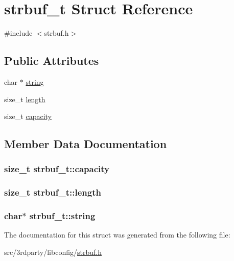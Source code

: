 \hypertarget{structstrbuf__t}{\section{strbuf\-\_\-t Struct Reference}
\label{structstrbuf__t}
}


{\ttfamily \#include $<$strbuf.\-h$>$}

\subsection*{Public Attributes}
\begin{DoxyCompactItemize}
\item 
char $\ast$ \hyperlink{structstrbuf__t_ac33d87e4a1e65b81c34728c08c58e225}{string}
\item 
size\-\_\-t \hyperlink{structstrbuf__t_ae6fc3758286e761d9c7873b489786a89}{length}
\item 
size\-\_\-t \hyperlink{structstrbuf__t_af532e798544a7dab19767406c6504649}{capacity}
\end{DoxyCompactItemize}


\subsection{Member Data Documentation}
\hypertarget{structstrbuf__t_af532e798544a7dab19767406c6504649}{
\subsubsection[{capacity}]{\setlength{\rightskip}{0pt plus 5cm}size\-\_\-t strbuf\-\_\-t\-::capacity}}\label{structstrbuf__t_af532e798544a7dab19767406c6504649}
\hypertarget{structstrbuf__t_ae6fc3758286e761d9c7873b489786a89}{
\subsubsection[{length}]{\setlength{\rightskip}{0pt plus 5cm}size\-\_\-t strbuf\-\_\-t\-::length}}\label{structstrbuf__t_ae6fc3758286e761d9c7873b489786a89}
\hypertarget{structstrbuf__t_ac33d87e4a1e65b81c34728c08c58e225}{
\subsubsection[{string}]{\setlength{\rightskip}{0pt plus 5cm}char$\ast$ strbuf\-\_\-t\-::string}}\label{structstrbuf__t_ac33d87e4a1e65b81c34728c08c58e225}


The documentation for this struct was generated from the following file\-:\begin{DoxyCompactItemize}
\item 
src/3rdparty/libconfig/\hyperlink{strbuf_8h}{strbuf.\-h}\end{DoxyCompactItemize}
